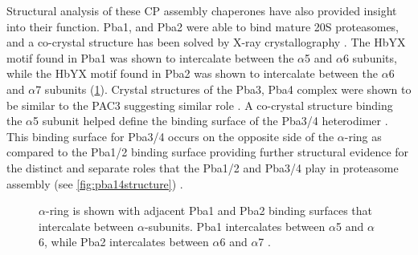 	Structural analysis of these CP assembly chaperones have also provided insight into their function. Pba1, and Pba2 were able to bind mature 20S proteasomes, and a co-crystal structure has been solved by X-ray crystallography \citep{stadtmueller12}. The HbYX motif found in Pba1 was shown to intercalate between the $\alpha$5 and $\alpha$6 subunits, while the HbYX motif found in Pba2 was shown to intercalate between the $\alpha$6 and $\alpha$7 subunits (\ref{fig:pba12hbyx}). Crystal structures of the Pba3, Pba4 complex were shown to be similar to the PAC3 suggesting similar role \citep{yashiroda08}. A co-crystal structure binding the $\alpha$5 subunit helped define the binding surface of the Pba3/4 heterodimer \citep{yashiroda08}. This binding surface for Pba3/4 occurs on the opposite side of the $\alpha$-ring as compared to the Pba1/2 binding surface providing further structural evidence for the distinct and separate roles that the Pba1/2 and Pba3/4 play in proteasome assembly (see \ref{fig:pba14structure}) \citep{stadtmueller12, yashiroda08}.

\begin{figure}[p]
	{$\alpha$-ring is shown with adjacent Pba1 and Pba2 binding surfaces that intercalate between $\alpha$-subunits. Pba1 intercalates between $\alpha$5 and $\alpha$6, while Pba2 intercalates between $\alpha$6 and $\alpha$7 \citep{yashiroda08}.}
	\label{fig:pba12hbyx}
\end{figure}

